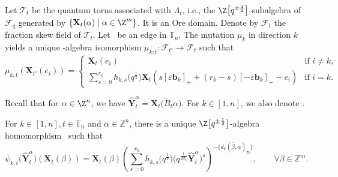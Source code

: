 Let $\mathcal{T}_{t}$ be the quantum torus associated with $\Lambda_{t}$, i.e., the $\Z\big[q^{\pm\frac{1}{2}}\big]$-subalgebra of $\mathcal{F}_q$ generated by $\{\mathbf{X}_t(\alpha)\mid \alpha\in \Z^m\}$. It is an Ore domain. Denote by $\mathcal{F}_t$ the fraction skew field of $\mathcal{T}_t$.
Let~ be an edge in $\mathbb{T}_n$. The mutation $\mu_k$ in direction $k$ yields a unique -algebra isomorphism $\mu_{k;t}\colon\mathcal{F}_{t'}\to \mathcal{F}_t$ such that
\[
 \mu_{k;t}(\mathbf{X}_{t'}(e_i))=\begin{cases}
 \mathbf{X}_t(e_i) &\text{if $i\neq k$,}\\
 \displaystyle \sum\limits_{s=0}^{r_k}h_{k,s}\bigl(q^{\frac{1}{2}}\bigr)\mathbf{X}_t(s[\varepsilon \mathbf{b}_k]_{+}+(r_{k}-s)[-\varepsilon \mathbf{b}_k]_+-e_i)&\text{if $i=k$.}
 \end{cases}
\]

Recall that for $\alpha\in \Z^n$, we have $\hat{\mathbf{Y}}_t^\alpha=\mathbf{X}_t\bigl(\tilde{B}_t\alpha\bigr)$. For $k\in [1,n]$, we also denote .
\begin{Lemma}
 For $k\in[1,n],t\in\mathbb{T}_{n}$ and $\alpha\in\mathbb{Z}^{n}$, there is a unique $\Z\big[q^{\pm\frac{1}{2}}\big]$-algebra homomorphism~ such that
 \[
\psi_{k;t}\bigl(\mathbf{\hat{Y}}_{t}^{\alpha}\bigr)(\mathbf{X}_t(\beta))=\mathbf{X}_{t}(\beta)\left(\sum\limits_{s=0}^{r_k} h_{k,s}\bigl(q^{\frac{1}{2}}\bigr)\bigl(q^{\frac{1}{2d_{k}}}\mathbf{\hat{Y}}_{t}^{\alpha}\bigr)^{s}\right)^{-\{d_{k}(\bar{\beta},\alpha)_D\}}, \qquad \forall \beta\in \mathbb{Z}^m.
 \]
 \end{Lemma}


